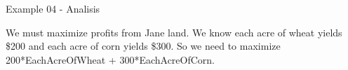 \begin{frame}{Example 04 - Analisis}

We must maximize profits from Jane land. We know each acre of wheat yields \$200
and each acre of corn yields \$300.
So we need to maximize 200*EachAcreOfWheat + 300*EachAcreOfCorn.

\end{frame}
